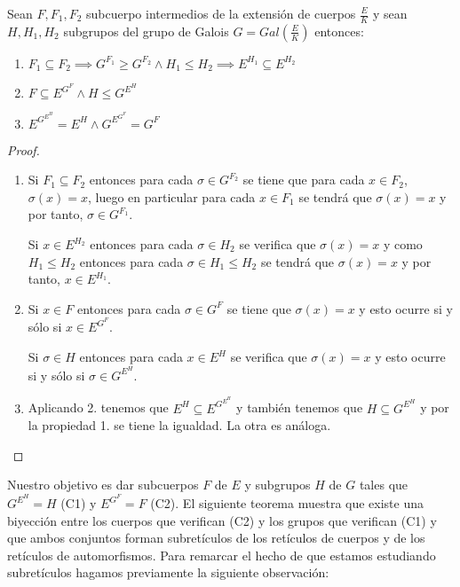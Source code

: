 \begin{proposition}
Sean $F,F_1,F_2$ subcuerpo intermedios de la extensión de cuerpos $\frac{E}{K}$ y sean $H,H_1,H_2$ subgrupos del grupo de Galois $G = Gal(\frac{E}{K})$ entonces:

\begin{enumerate}
\item $F_1 \subseteq F_2 \implies G^{F_1} \ge G^{F_2} \land H_1 \le H_2 \implies E^{H_1} \subseteq E^{H_2}$
\item $F \subseteq E^{G^F} \land H \le G^{E^H}$
\item $E^{G^{E^H}} = E^H \land G^{E^{G^F}} = G^F$
\end{enumerate}
\end{proposition}
\begin{proof}
\begin{enumerate}
\item Si $F_1 \subseteq F_2$ entonces para cada $\sigma \in G^{F_2}$ se tiene que para cada $x \in F_2$, $\sigma(x) = x$, luego en particular para cada $x \in F_1$ se tendrá que $\sigma(x) = x$ y por tanto, $\sigma \in G^{F_1}$.

Si $x \in E^{H_2}$ entonces para cada $\sigma \in H_2$ se verifica que $\sigma(x) = x$ y como $H_1 \le H_2$ entonces para cada $\sigma \in H_1 \le H_2$ se tendrá que $\sigma(x) = x$ y por tanto, $x \in E^{H_1}$. 

\item Si $x \in F$ entonces para cada $\sigma \in G^F$ se tiene que $\sigma(x) = x$ y esto ocurre si y sólo si $x \in E^{G^F}$. 

Si $\sigma \in H$ entonces para cada $x \in E^H$ se verifica que $\sigma(x) = x$ y esto ocurre si y sólo si $\sigma \in G^{E^H}$. 

\item Aplicando 2. tenemos que $E^H \subseteq E^{G^{E^H}}$ y también tenemos que $H \subseteq G^{E^H}$ y por la propiedad 1. se tiene la igualdad. La otra es análoga. 
\end{enumerate}
\end{proof}

Nuestro objetivo es dar subcuerpos $F$ de $E$ y subgrupos $H$ de $G$ tales que $G^{E^H} = H$ (C1) y $E^{G^F} = F$ (C2). El siguiente teorema muestra que existe una biyección entre los cuerpos que verifican (C2) y los grupos que verifican (C1) y que ambos conjuntos forman subretículos de los retículos de cuerpos y de los retículos de automorfismos. Para remarcar el hecho de que estamos estudiando subretículos hagamos previamente la siguiente observación:

